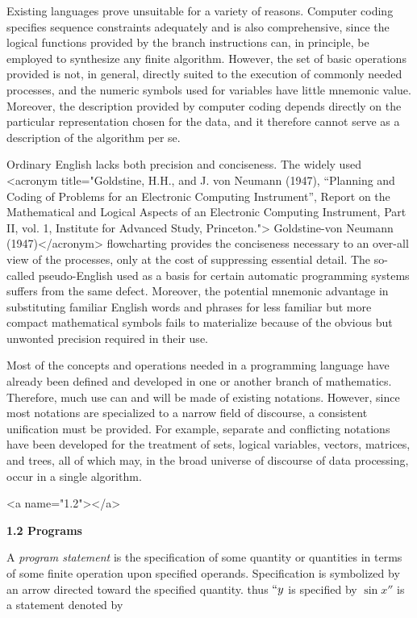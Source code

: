 \par Existing languages prove unsuitable for a variety of reasons. Computer coding specifies sequence constraints adequately and is also comprehensive, since the logical functions provided by the branch instructions can, in principle, be employed to synthesize any finite algorithm. However, the set of basic operations provided is not, in general, directly suited to the execution of commonly needed processes, and the numeric symbols used for variables have little mnemonic value. Moreover, the description provided by computer coding depends directly on the particular representation chosen for the data, and it therefore cannot serve as a description of the algorithm per se.

\par Ordinary English lacks both precision and conciseness. The widely used 
<acronym title="Goldstine, H.H., and J. von Neumann (1947), “Planning and Coding of Problems for an Electronic Computing Instrument”, Report on the Mathematical and Logical Aspects of an Electronic Computing Instrument, Part II, vol. 1, Institute for Advanced Study, Princeton."> Goldstine-von Neumann (1947)</acronym> flowcharting provides the conciseness necessary to an over-all view of the processes, only at the cost of suppressing essential detail. The so-called pseudo-English used as a basis for certain automatic programming systems suffers from the same defect. Moreover, the potential mnemonic advantage in substituting familiar English words and phrases for less familiar but more compact mathematical symbols fails to materialize because of the obvious but unwonted precision required in their use.

\par Most of the concepts and operations needed in a programming language have already been defined and developed in one or another branch of mathematics. Therefore, much use can and will be made of existing notations. However, since most notations are specialized to a narrow field of discourse, a consistent unification must be provided. For example, separate and conflicting notations have been developed for the treatment of sets, logical variables, vectors, matrices, and trees, all of which may, in the broad universe of discourse of data processing, occur in a single algorithm.

<a name="1.2"></a>
\par \textbf{1.2 Programs}

\par A \textit{program statement} is the specification of some quantity or quantities in terms of some finite operation upon specified operands. Specification is symbolized by an arrow directed toward the specified quantity. thus $``y$ is specified by $\sin x''$ is a statement denoted by


